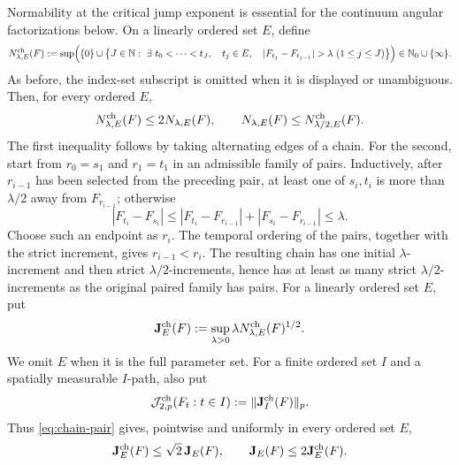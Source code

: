 \documentclass[11pt]{article}
\numberwithin{equation}{section}
\theoremstyle{remark}
\theoremstyle{definition}
\newcommand{\norm}[1]{\lVert #1\rVert}
\begin{document}
Normability at the critical jump exponent is essential for the continuum
angular factorizations below.  On a linearly ordered set $E$, define
\[
 N^{\rm ch}_{\lambda,E}(F):=\sup\Bigl(\{0\}\cup
 \bigl\{J\in\mathbb N:\ \exists\ t_0<\cdots<t_J,\quad t_j\in E,\quad
 |F_{t_j}-F_{t_{j-1}}|>\lambda\ (1\le j\le J)\bigr\}\Bigr)
 \in\mathbb N_0\cup\{\infty\}.
\]
As before, the index-set subscript is omitted when it is displayed or
unambiguous.  Then, for every ordered $E$,
\begin{equation}\label{eq:chain-pair}
 N^{\rm ch}_{\lambda,E}(F)\le2N_{\lambda,E}(F),
 \qquad N_{\lambda,E}(F)\le N^{\rm ch}_{\lambda/2,E}(F).
\end{equation}
The first inequality follows by taking alternating edges of a chain.  For
the second, start from $r_0=s_1$ and $r_1=t_1$ in an admissible family of
pairs.  Inductively, after $r_{i-1}$ has been selected from the preceding
pair, at least one of $s_i,t_i$ is more than $\lambda/2$ away from
$F_{r_{i-1}}$; otherwise
\[
 |F_{t_i}-F_{s_i}|
 \le |F_{t_i}-F_{r_{i-1}}|+|F_{s_i}-F_{r_{i-1}}|
 \le\lambda.
\]
Choose such an endpoint as $r_i$.  The temporal ordering of the pairs,
together with the strict increment, gives $r_{i-1}<r_i$.  The resulting
chain has one initial $\lambda$-increment and then strict
$\lambda/2$-increments, hence has at least as many strict
$\lambda/2$-increments as the original paired family has pairs.  For a
linearly ordered set $E$, put
\begin{equation}\label{eq:chain-jump-seminorm-definition}
 \mathbf J_E^{\rm ch}(F)
 :=\sup_{\lambda>0}\lambda
 N^{\rm ch}_{\lambda,E}(F)^{1/2}.
\end{equation}
We omit $E$ when it is the full parameter set.  For a finite ordered set
$I$ and a spatially measurable $I$-path, also put
\begin{equation}\label{eq:finite-chain-jump-spatial-norm}
 \mathcal J^{\rm ch}_{2,p}(F_t:t\in I)
 :=\norm{\mathbf J_I^{\rm ch}(F)}_p.
\end{equation}
Thus \eqref{eq:chain-pair} gives, pointwise and uniformly in every ordered
set $E$,
\begin{equation}\label{eq:chain-pair-functional}
 \mathbf J_E^{\rm ch}(F)\le\sqrt2\,\mathbf J_E(F),
 \qquad
 \mathbf J_E(F)\le2\mathbf J_E^{\rm ch}(F).
\end{equation}
\end{document}
